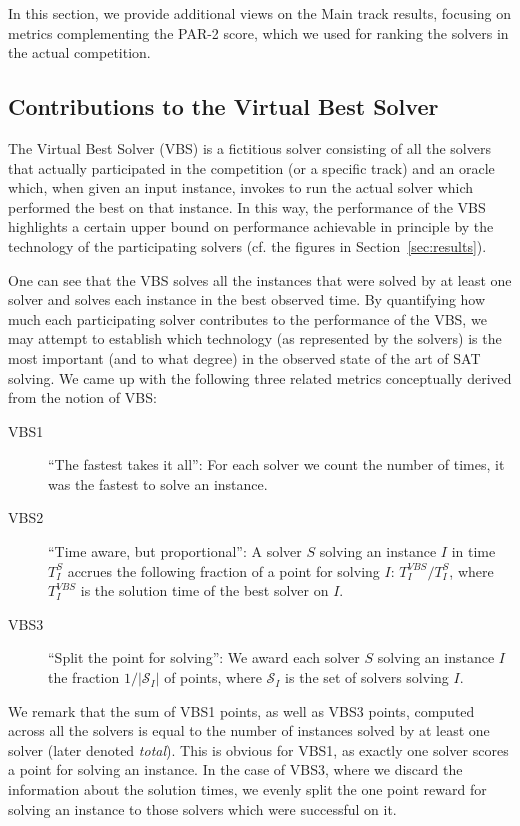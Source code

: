 \documentclass{elsarticle}
\begin{document}
In this section, we provide additional views on the Main track results,
focusing on metrics complementing the PAR-2 score, 
which we used for ranking the solvers in the actual competition.

\subsection{Contributions to the Virtual Best Solver}

The Virtual Best Solver (VBS) is a fictitious solver consisting 
of all the solvers that actually participated in the competition (or a specific track)
and an oracle which, when given an input instance,
invokes to run the actual solver which performed the best on that instance.
In this way, the performance of the VBS highlights a certain upper bound 
on performance achievable in principle by the technology 
of the participating solvers (cf. the figures in Section~\ref{sec:results}). 

One can see that the VBS solves all the instances that
were solved by at least one solver and solves each instance in the best observed time.
By quantifying how much each participating solver contributes
to the performance of the VBS, we may attempt to establish which
technology (as represented by the solvers) is the most important
(and to what degree) in the observed state of the art of SAT solving.
We came up with the following three related metrics conceptually derived
from the notion of VBS:
\begin{description}
\item[VBS1]
``The fastest takes it all'':
For each solver we count the number of times, it was the fastest to solve an instance.
\item[VBS2]
``Time aware, but proportional'':
A solver $S$ solving an instance $I$ in time $T^S_I$ accrues 
the following fraction of a point for solving $I$:
$T^\mathit{VBS}_I/T^S_I$, where $T^\mathit{VBS}_I$ is the solution time of the best solver on $I$.
\item[VBS3]
``Split the point for solving'':
We award each solver $S$ solving an instance $I$ the fraction $1/|\mathcal{S}_I|$ of points, where
$\mathcal{S}_I$ is the set of solvers solving $I$.
\end{description}
We remark that the sum of VBS1 points, as well as VBS3 points, computed across all the solvers
is equal to the number of instances solved by at least one solver (later denoted \emph{total}).
This is obvious for VBS1, as exactly one solver scores a point for solving an instance.
In the case of VBS3, where we discard the information about the solution times, 
we evenly split the one point reward for solving an instance to those solvers which were successful on it.
\end{document}
